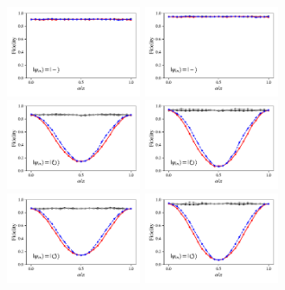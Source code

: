 \documentclass[a4paper]{article}
\begin{document}
\begin{figure}[H]
	\\
	\includegraphics[width=0.35\textwidth]{fidelity_qc7_mit1_state3}
	\includegraphics[width=0.35\textwidth]{fidelity_qc7_mit0_state3}
	\\
	\includegraphics[width=0.35\textwidth]{fidelity_qc7_mit1_state4}
	\includegraphics[width=0.35\textwidth]{fidelity_qc7_mit0_state4}
	\\
	\includegraphics[width=0.35\textwidth]{fidelity_qc7_mit1_state5}
	\includegraphics[width=0.35\textwidth]{fidelity_qc7_mit0_state5}
\end{figure}
\end{document}
